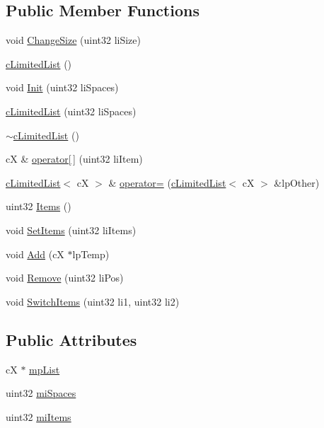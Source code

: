 \subsection*{Public Member Functions}
\begin{DoxyCompactItemize}
\item 
void \hyperlink{classc_limited_list_ad909f4fc3256bfa9bc83b9baef8cac80}{ChangeSize} (uint32 liSize)
\item 
\hyperlink{classc_limited_list_a56cdd868a5924449791625ed2e462b03}{cLimitedList} ()
\item 
void \hyperlink{classc_limited_list_a29c4134a24a54d2d57498bb67447446e}{Init} (uint32 liSpaces)
\item 
\hyperlink{classc_limited_list_ae7c757c09f497da319f989e2042d488f}{cLimitedList} (uint32 liSpaces)
\item 
\hyperlink{classc_limited_list_ab7b63990b25112ae8cbf877b4fce7eed}{$\sim$cLimitedList} ()
\item 
cX \& \hyperlink{classc_limited_list_ae11b7c0a82de56c938eaf6d814838048}{operator\mbox{[}$\,$\mbox{]}} (uint32 liItem)
\item 
\hyperlink{classc_limited_list}{cLimitedList}$<$ cX $>$ \& \hyperlink{classc_limited_list_af6efd3116def79b9ca62cccc7ded030f}{operator=} (\hyperlink{classc_limited_list}{cLimitedList}$<$ cX $>$ \&lpOther)
\item 
uint32 \hyperlink{classc_limited_list_a0109c9831d7bf20d5ba259fc188be714}{Items} ()
\item 
void \hyperlink{classc_limited_list_a8a01caffbb1d69abf97481f12e59768d}{SetItems} (uint32 liItems)
\item 
void \hyperlink{classc_limited_list_a71e9c546a89a1be5cd656cc1284b4475}{Add} (cX $\ast$lpTemp)
\item 
void \hyperlink{classc_limited_list_a944c6ae2b1e13a144cc384766f9c12ae}{Remove} (uint32 liPos)
\item 
void \hyperlink{classc_limited_list_a378286ba482d356510d9a7a7b00395d9}{SwitchItems} (uint32 li1, uint32 li2)
\end{DoxyCompactItemize}
\subsection*{Public Attributes}
\begin{DoxyCompactItemize}
\item 
cX $\ast$ \hyperlink{classc_limited_list_aa3b0a10ecf4169b9bd7b41b0152e6a6a}{mpList}
\item 
uint32 \hyperlink{classc_limited_list_add31decc488d48f0037fe57a56c9aa4a}{miSpaces}
\item 
uint32 \hyperlink{classc_limited_list_a9509f6f3a5d9ad28608fbf288e43cf37}{miItems}
\end{DoxyCompactItemize}


